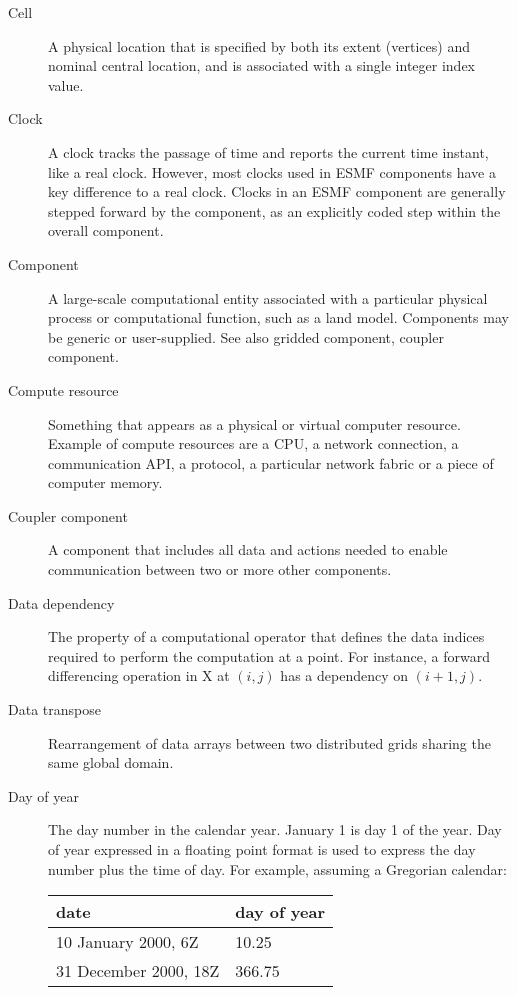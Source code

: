 \begin{description}
\item[Cell] \label{glos:Cell} A physical location that is specified by both 
  its extent (vertices) and nominal central location, and is associated with 
  a single integer index value.  

\item[Clock] \label{glos:Clock} A clock tracks the passage of time and 
reports the current time instant, like a real clock.  However, most clocks 
used in ESMF components have a key difference to a real clock. Clocks 
in an ESMF component are generally stepped forward by the component, as an 
explicitly coded step within the overall component.

\item[Component] \label{glos:Component} A large-scale computational entity 
  associated with a particular physical process or computational function, 
  such as a land model.  Components may be generic or user-supplied.  
  See also gridded component, coupler component.

\item[Compute resource] \label{glos:CompResource} Something that appears as a
  physical or virtual computer resource. Example of compute resources
  are a CPU, a network connection, a communication API, a protocol, a 
  particular network fabric or a piece of computer memory. 

\item[Coupler component] \label{glos:Coupler}
  A component that includes all data and actions needed to enable 
  communication between two or more other components.

\item[Data dependency] \label{glos:DataDep} The property of a computational
  operator that defines the data indices required to perform
  the computation at a point.  For instance, a forward differencing
  operation in X at $(i,j)$ has a dependency on $(i+1,j)$.

\item[Data transpose] \label{glos:DataTranspose} Rearrangement of data arrays 
  between two distributed grids sharing the same global domain.

\item[Day of year] \label{glos:DayOfYear} The day number in the calendar year. 
January 1 is day 1 of the year. Day of year expressed in a floating point 
format is used to express the day number plus the time of day. 
For example, assuming a Gregorian calendar:

\begin{tabular}{ll}
{\bf date}              & {\bf day of year} \\
\hline 
10 January 2000, 6Z     & 10.25 \\
31 December 2000, 18Z   & 366.75 
\end{tabular}


\end{description}
